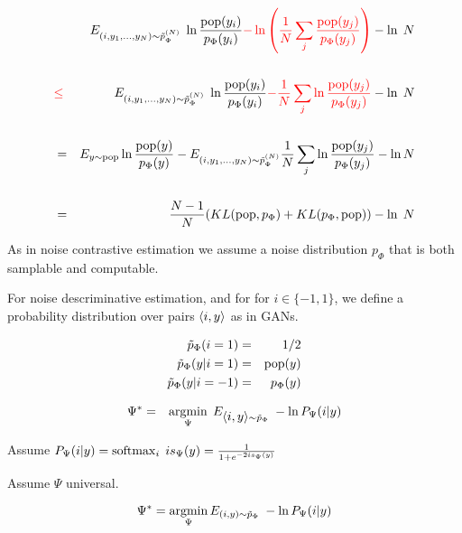 {\huge
 \begin{eqnarray*}
    & & E_{(i,y_1,\ldots,y_{N}) \sim \tilde{p}_\Phi^{(N)}}\;\ln\frac{\mathrm{pop}(y_i)}{p_\Phi(y_i)} {\color{red} - \ln\left(\frac{1}{N}\sum_j \frac{\mathrm{pop}(y_j)}{p_\Phi(y_j)} \right)} - \ln\;N \\
    \\
    & {\color{red} \leq} & E_{(i,y_1,\ldots,y_{N}) \sim \tilde{p}_\Phi^{(N)}}\;\ln\frac{\mathrm{pop}(y_i)}{p_\Phi(y_i)} {\color{red} - \frac{1}{N} \sum_j \ln\frac{\mathrm{pop}(y_j)}{p_\Phi(y_j)}} - \ln\;N \\
    \\
    & = & E_{y \sim \mathrm{pop}} \ln \frac{\mathrm{pop}(y)}{p_\Phi(y)} -  E_{(i,y_1,\ldots,y_N) \sim \tilde{p}^{(N)}_\Phi} \frac{1}{N} \sum_j \ln\frac{\mathrm{pop}(y_j)}{p_\Phi(y_j)} - \ln N \\
    \\
    & = & \frac{N-1}{N}(KL(\mathrm{pop},p_\Phi) + KL(p_\Phi,\mathrm{pop})) - \ln\;N \\
  \end{eqnarray*}
}



As in noise contrastive estimation we assume a noise distribution $p_\Phi$ that is both samplable and computable.

\vfill
For noise descriminative estimation, and for for $i \in \{-1,1\}$, we define a probability distribution over pairs
${\mbox{$\langle i,y\rangle$}}$ as in GANs.

\vfill

\begin{eqnarray*}
\tilde{p}_\Phi(i = 1) & = & 1/2 \\
\tilde{p}_\Phi(y|i=1) & =&  \mathrm{pop}(y) \\
\tilde{p}_\Phi(y|i=-1) & = & p_\Phi(y)
\end{eqnarray*}


\begin{eqnarray*}
  \Psi^* & = & \operatorname*{argmin}_\Psi\;E_{{\mbox{$\langle i,y\rangle$}} \sim \tilde{p}_\Phi}\;-\ln P_\Psi(i|y)
\end{eqnarray*}

\vfill
Assume $P_\Psi(i|y) = \operatorname*{softmax}_i \;is_\Psi(y) = \frac{1}{1+e^{-2is_\Psi(y)}}$

\vfill
Assume $\Psi$ universal.


$$\Psi^* = \operatorname*{argmin}_\Psi E_{(i,y) \sim \tilde{p}_\Phi} \;- \ln P_\Psi(i|y)$$

